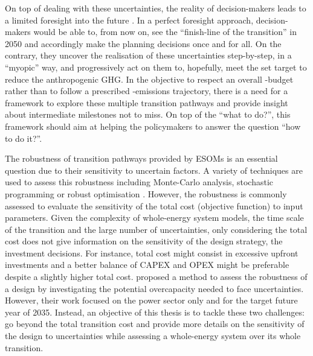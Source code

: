 On top of dealing with these uncertainties, the reality of decision-makers leads to a limited foresight into the future \cite{poncelet2016myopic}. In a perfect foresight approach, decision-makers would be able to, from now on, see the ``finish-line of the transition'' in 2050 and accordingly make the planning decisions once and for all. On the contrary, they uncover the realisation of these uncertainties step-by-step, in a ``myopic'' way, and progressively act on them to, hopefully, meet the set target to reduce the anthropogenic \gls{GHG}. In the objective to respect an overall -budget rather than to follow a prescribed -emissions trajectory, there is a need for a framework to explore these multiple transition pathways and provide insight about intermediate milestones not to miss. On top of the ``what to do?'', this framework should aim at helping the policymakers to answer the  question ``how to do it?''.

The robustness of transition pathways provided by ESOMs is an essential question due to their sensitivity to uncertain factors. A variety of techniques are used to assess this robustness including Monte-Carlo analysis, stochastic programming or robust optimisation \cite{yue2018review}. However, the robustness is commonly assessed to evaluate the sensitivity of the total cost (objective function) to input parameters.  Given the complexity of whole-energy system models, the time scale of the transition and the large number of uncertainties, only considering the total cost does not give information on the sensitivity of the design strategy, \ie the investment decisions. For instance, total cost might consist in excessive upfront investments and a better balance of \gls{CAPEX} and \gls{OPEX} might be preferable despite a slightly higher total cost. \citet{moret2020overcapacity} proposed a method to assess the robustness of a design by investigating the potential overcapacity needed to face uncertainties. However, their work focused on the power sector only and for the target future year of 2035.  Instead, an objective of this thesis is to tackle these two challenges: go beyond the total transition cost and provide more details on the sensitivity of the design to uncertainties while assessing a whole-energy system over its whole transition.\\

